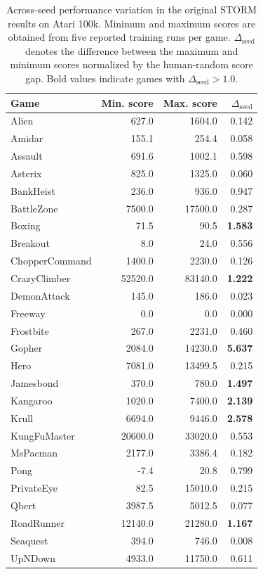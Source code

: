 \documentclass{article} %
\begin{document}
\begin{table}[H]
\centering
\small
\caption{Across-seed performance variation in the original STORM results on Atari 100k. Minimum and maximum scores are obtained from five reported training runs per game. $\Delta_{\mathrm{seed}}$ denotes the difference between the maximum and minimum scores normalized by the human-random score gap. Bold values indicate games with $\Delta_{\mathrm{seed}} > 1.0$.}
\label{tab:storm_seed_variation}
\begin{tabular}{lrrr}
\toprule
Game & Min. score & Max. score & $\Delta_{\mathrm{seed}}$ \\
\midrule
Alien & 627.0 & 1604.0 & 0.142 \\
Amidar & 155.1 & 254.4 & 0.058 \\
Assault & 691.6 & 1002.1 & 0.598 \\
Asterix & 825.0 & 1325.0 & 0.060 \\
BankHeist & 236.0 & 936.0 & 0.947 \\
BattleZone & 7500.0 & 17500.0 & 0.287 \\
Boxing & 71.5 & 90.5 & \textbf{1.583} \\
Breakout & 8.0 & 24.0 & 0.556 \\
ChopperCommand & 1400.0 & 2230.0 & 0.126 \\
CrazyClimber & 52520.0 & 83140.0 & \textbf{1.222} \\
DemonAttack & 145.0 & 186.0 & 0.023 \\
Freeway & 0.0 & 0.0 & 0.000 \\
Frostbite & 267.0 & 2231.0 & 0.460 \\
Gopher & 2084.0 & 14230.0 & \textbf{5.637} \\
Hero & 7081.0 & 13499.5 & 0.215 \\
Jamesbond & 370.0 & 780.0 & \textbf{1.497} \\
Kangaroo & 1020.0 & 7400.0 & \textbf{2.139} \\
Krull & 6694.0 & 9446.0 & \textbf{2.578} \\
KungFuMaster & 20600.0 & 33020.0 & 0.553 \\
MsPacman & 2177.0 & 3386.4 & 0.182 \\
Pong & -7.4 & 20.8 & 0.799 \\
PrivateEye & 82.5 & 15010.0 & 0.215 \\
Qbert & 3987.5 & 5012.5 & 0.077 \\
RoadRunner & 12140.0 & 21280.0 & \textbf{1.167} \\
Seaquest & 394.0 & 746.0 & 0.008 \\
UpNDown & 4933.0 & 11750.0 & 0.611 \\
\bottomrule
\end{tabular}
\end{table}
\end{document}
